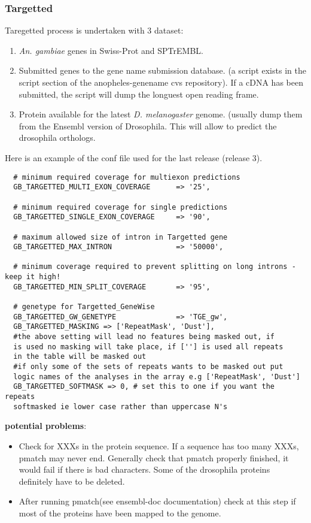 \documentclass[a4paper,10pt]{article}
\begin{document}
\subsubsection{Targetted}
Taregetted process is undertaken with 3 dataset:
\begin{enumerate}
\item \textit{An. gambiae} genes in Swiss-Prot and SPTrEMBL.
\item Submitted genes to the gene name submission database. (a script exists in the script section of the anopheles-genename cvs repository). If a cDNA has been submitted, the script will dump the longuest open reading frame.
\item Protein available for the latest \textit{D. melanogaster} genome. (usually dump them from the Ensembl version of Drosophila. This will allow to predict the drosophila orthologs.
\end{enumerate}

Here is an example of the conf file used for the last release (release 3).%
\begin{verbatim}
  # minimum required coverage for multiexon predictions
  GB_TARGETTED_MULTI_EXON_COVERAGE      => '25',
  
  # minimum required coverage for single predictions
  GB_TARGETTED_SINGLE_EXON_COVERAGE     => '90',
  
  # maximum allowed size of intron in Targetted gene
  GB_TARGETTED_MAX_INTRON               => '50000',
  
  # minimum coverage required to prevent splitting on long introns - keep it high!
  GB_TARGETTED_MIN_SPLIT_COVERAGE       => '95',
  
  # genetype for Targetted_GeneWise
  GB_TARGETTED_GW_GENETYPE              => 'TGE_gw',	   
  GB_TARGETTED_MASKING => ['RepeatMask', 'Dust'],
  #the above setting will lead no features being masked out, if
  is used no masking will take place, if [''] is used all repeats 
  in the table will be masked out
  #if only some of the sets of repeats wants to be masked out put 
  logic names of the analyses in the array e.g ['RepeatMask', 'Dust']
  GB_TARGETTED_SOFTMASK => 0, # set this to one if you want the repeats 
  softmasked ie lower case rather than uppercase N's
\end{verbatim}

\textbf{potential problems}:
\begin{itemize}
\item Check for XXXs in the protein sequence. If a sequence has too many XXXs, pmatch may never end. Generally check that pmatch properly finished, it would fail if there is bad characters. Some of the drosophila proteins definitely have to be deleted.
\item After running pmatch(see ensembl-doc documentation) check at this step if most of the proteins have been mapped to the genome. 
\end{itemize}
\end{document}
